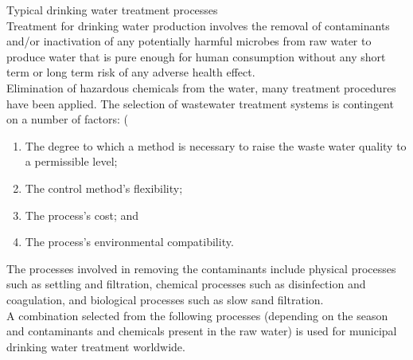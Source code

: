 \documentclass{article}
\begin{document}
Typical drinking water treatment processes\\
Treatment for drinking water production involves the removal of contaminants and/or inactivation of any potentially harmful microbes from raw water to produce water that is pure enough for human consumption without any short term or long term risk of any adverse health effect.\\

Elimination of hazardous chemicals from the water, many treatment procedures have been applied. The selection of wastewater treatment systems is contingent on a number of factors: (
\begin{enumerate}
\item The degree to which a method is necessary to raise the waste water quality to a permissible level; 
\item The control method's flexibility;
\item The process's cost; and
\item The process's environmental compatibility.\\
\end{enumerate}
The processes involved in removing the contaminants include physical processes such as settling and filtration, chemical processes such as disinfection and coagulation, and biological processes such as slow sand filtration.\\
A combination selected from the following processes (depending on the season and contaminants and chemicals present in the raw water) is used for municipal drinking water treatment worldwide.\\
\end{document}

